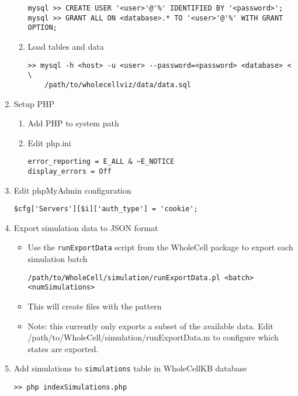 \documentclass[twoside]{book}
\begin{document}
\begin{enumerate}
\begin{enumerate}
		\begin{verbatim}
mysql >> CREATE USER '<user>'@'%' IDENTIFIED BY '<password>';
mysql >> GRANT ALL ON <database>.* TO '<user>'@'%' WITH GRANT OPTION;
		\end{verbatim}
	\item Load tables and data
		\begin{verbatim}
>> mysql -h <host> -u <user> --password=<password> <database> < \
	/path/to/wholecellviz/data/data.sql
		\end{verbatim}
	\end{enumerate}
\item Setup PHP
	\begin{enumerate}
	\item Add PHP to system path
	\item Edit php.ini
		\begin{verbatim}
error_reporting = E_ALL & ~E_NOTICE
display_errors = Off
		\end{verbatim}
	\end{enumerate}
\item Edit phpMyAdmin configuration
	\begin{verbatim}
$cfg['Servers'][$i]['auth_type'] = 'cookie';
	\end{verbatim}
\item Export simulation data to JSON format
	\begin{itemize}
	\item Use the \texttt{runExportData} script from the WholeCell package to export each simulation batch
		\begin{verbatim}
/path/to/WholeCell/simulation/runExportData.pl <batch> <numSimulations>
		\end{verbatim}
	\item This will create files with the pattern 
	\item Note: this currently only exports a subset of the available data. Edit /path/to/WholeCell/simulation/runExportData.m to configure which states are exported.
	\end{itemize}
\item Add simulations to \texttt{simulations} table in WholeCellKB database
	\begin{verbatim}
>> php indexSimulations.php
	\end{verbatim}
\end{enumerate}

\end{document}
